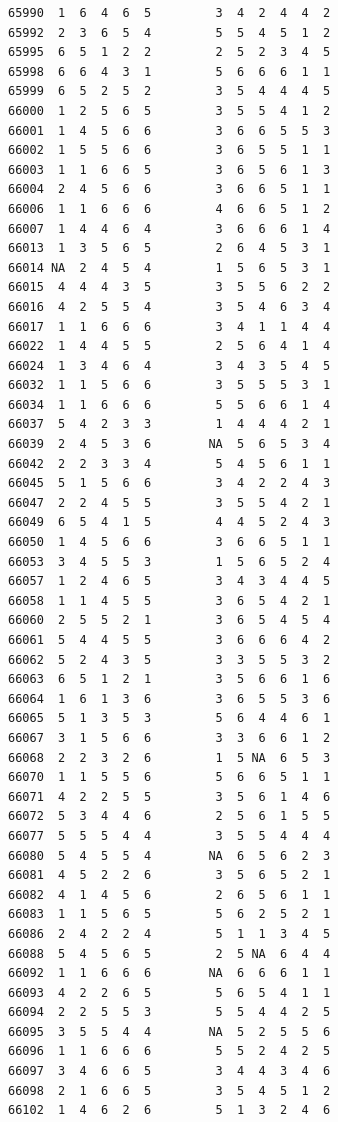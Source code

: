 \documentclass[
  letterpaper,
  DIV=11,
  numbers=noendperiod]{scrreprt}
\begin{document}
\begin{verbatim}
65990  1  6  4  6  5         3  4  2  4  4  2
65992  2  3  6  5  4         5  5  4  5  1  2
65995  6  5  1  2  2         2  5  2  3  4  5
65998  6  6  4  3  1         5  6  6  6  1  1
65999  6  5  2  5  2         3  5  4  4  4  5
66000  1  2  5  6  5         3  5  5  4  1  2
66001  1  4  5  6  6         3  6  6  5  5  3
66002  1  5  5  6  6         3  6  5  5  1  1
66003  1  1  6  6  5         3  6  5  6  1  3
66004  2  4  5  6  6         3  6  6  5  1  1
66006  1  1  6  6  6         4  6  6  5  1  2
66007  1  4  4  6  4         3  6  6  6  1  4
66013  1  3  5  6  5         2  6  4  5  3  1
66014 NA  2  4  5  4         1  5  6  5  3  1
66015  4  4  4  3  5         3  5  5  6  2  2
66016  4  2  5  5  4         3  5  4  6  3  4
66017  1  1  6  6  6         3  4  1  1  4  4
66022  1  4  4  5  5         2  5  6  4  1  4
66024  1  3  4  6  4         3  4  3  5  4  5
66032  1  1  5  6  6         3  5  5  5  3  1
66034  1  1  6  6  6         5  5  6  6  1  4
66037  5  4  2  3  3         1  4  4  4  2  1
66039  2  4  5  3  6        NA  5  6  5  3  4
66042  2  2  3  3  4         5  4  5  6  1  1
66045  5  1  5  6  6         3  4  2  2  4  3
66047  2  2  4  5  5         3  5  5  4  2  1
66049  6  5  4  1  5         4  4  5  2  4  3
66050  1  4  5  6  6         3  6  6  5  1  1
66053  3  4  5  5  3         1  5  6  5  2  4
66057  1  2  4  6  5         3  4  3  4  4  5
66058  1  1  4  5  5         3  6  5  4  2  1
66060  2  5  5  2  1         3  6  5  4  5  4
66061  5  4  4  5  5         3  6  6  6  4  2
66062  5  2  4  3  5         3  3  5  5  3  2
66063  6  5  1  2  1         3  5  6  6  1  6
66064  1  6  1  3  6         3  6  5  5  3  6
66065  5  1  3  5  3         5  6  4  4  6  1
66067  3  1  5  6  6         3  3  6  6  1  2
66068  2  2  3  2  6         1  5 NA  6  5  3
66070  1  1  5  5  6         5  6  6  5  1  1
66071  4  2  2  5  5         3  5  6  1  4  6
66072  5  3  4  4  6         2  5  6  1  5  5
66077  5  5  5  4  4         3  5  5  4  4  4
66080  5  4  5  5  4        NA  6  5  6  2  3
66081  4  5  2  2  6         3  5  6  5  2  1
66082  4  1  4  5  6         2  6  5  6  1  1
66083  1  1  5  6  5         5  6  2  5  2  1
66086  2  4  2  2  4         5  1  1  3  4  5
66088  5  4  5  6  5         2  5 NA  6  4  4
66092  1  1  6  6  6        NA  6  6  6  1  1
66093  4  2  2  6  5         5  6  5  4  1  1
66094  2  2  5  5  3         5  5  4  4  2  5
66095  3  5  5  4  4        NA  5  2  5  5  6
66096  1  1  6  6  6         5  5  2  4  2  5
66097  3  4  6  6  5         3  4  4  3  4  6
66098  2  1  6  6  5         3  5  4  5  1  2
66102  1  4  6  2  6         5  1  3  2  4  6

\end{verbatim}
\end{document}
